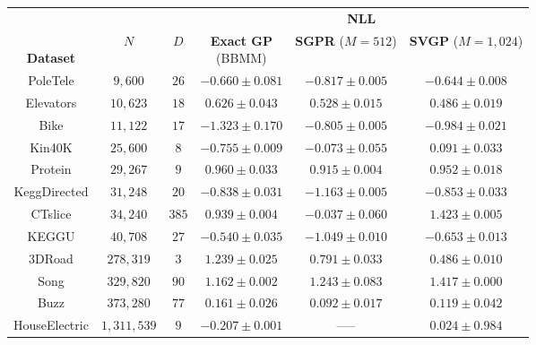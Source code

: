 \begin{tabular}{ cccccc }
  \toprule
  &&&
	\multicolumn{3}{c}{{\bf NLL}}  \\
  \cmidrule{4-6}
  \thead{\\{\bf Dataset}} & \thead{\\$N$} & \thead{\\$D$} &
  \thead{{\bf Exact GP} \\ (BBMM)} & \thead{{\bf SGPR} \\ ($M\!=\!512$)} & \thead{{\bf SVGP} \\ ($M\!=\!1,\!024$)}
  \\
  \midrule
	PoleTele             & $9,\!600$          & $26$  &    $-0.660\pm 0.081$          &  $-0.817\pm 0.005$             &  $\mathbf{-0.644}\pm 0.008$    \\
	Elevators            & $10,\!623$         & $18$  &     $0.626\pm 0.043$          &   $0.528\pm 0.015$             &   $\mathbf{0.486}\pm 0.019$    \\
	Bike                 & $11,\!122$         & $17$  &    $\mathbf{-1.323}\pm 0.170$ &  $-0.805\pm 0.005$             &  $-0.984\pm 0.021$             \\
	Kin40K               & $25,\!600$         & $8$   &    $\mathbf{-0.755}\pm 0.009$ &  $-0.073\pm 0.055$             &   $0.091\pm 0.033$             \\
	Protein              & $29,\!267$         & $9$   &     $0.960\pm 0.033$          &   $\mathbf{0.915}\pm 0.004$    &   $0.952\pm 0.018$             \\
	KeggDirected         & $31,\!248$         & $20$  &    $-0.838\pm 0.031$          &  $\mathbf{-1.163}\pm 0.005$    &  $-0.853\pm 0.033$             \\
	CTslice              & $34,\!240$         & $385$ &     $0.939\pm 0.004$          &  $\mathbf{-0.037}\pm 0.060$    &   $1.423\pm 0.005$             \\
	KEGGU                & $40,\!708$         & $27$  &    $-0.540\pm 0.035$          &  $\mathbf{-1.049}\pm 0.010$    &  $-0.653\pm 0.013$             \\
	3DRoad               & $278,\!319$        & $3$   &     $1.239\pm 0.025$          &   $0.791\pm 0.033$             &   $\mathbf{0.486}\pm 0.010$    \\
	Song                 & $329,\!820$        & $90$  &     $\mathbf{1.162}\pm 0.002$ &   $1.243\pm 0.083$             &   $1.417\pm 0.000$             \\
	Buzz                 & $373,\!280$        & $77$  &     $0.161\pm 0.026$          &   $\mathbf{0.092}\pm 0.017$    &   $0.119\pm 0.042$             \\
	HouseElectric        & $1,\!311,\!539$    & $9$   &    $\mathbf{-0.207}\pm 0.001$ & -----                          &   $0.024\pm 0.984$             \\
  \bottomrule
\end{tabular}
